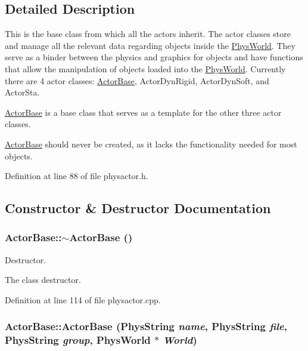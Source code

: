 \subsection{Detailed Description}
This is the base class from which all the actors inherit. The actor classes store and manage all the relevant data regarding objects inside the \hyperlink{classPhysWorld}{PhysWorld}. They serve as a binder between the physics and graphics for objects and have functions that allow the manipulation of objects loaded into the \hyperlink{classPhysWorld}{PhysWorld}. Currently there are 4 actor classes: \hyperlink{classActorBase}{ActorBase}, ActorDynRigid, ActorDynSoft, and ActorSta. \par
 \hyperlink{classActorBase}{ActorBase} is a base class that serves as a template for the other three actor classes. \par
 \hyperlink{classActorBase}{ActorBase} should never be created, as it lacks the functionality needed for most objects. 

Definition at line 88 of file physactor.h.



\subsection{Constructor \& Destructor Documentation}
\hypertarget{classActorBase_a6fd984c46b3232c2522adb44be4dedb7}{
\subsubsection[{$\sim$ActorBase}]{\setlength{\rightskip}{0pt plus 5cm}ActorBase::$\sim$ActorBase ()}}
\label{dd/d7b/classActorBase_a6fd984c46b3232c2522adb44be4dedb7}


Destructor. 

The class destructor. 

Definition at line 114 of file physactor.cpp.

\hypertarget{classActorBase_a673d963aa7a99475cb03250c010dfa15}{
\subsubsection[{ActorBase}]{\setlength{\rightskip}{0pt plus 5cm}ActorBase::ActorBase (PhysString {\em name}, \/  PhysString {\em file}, \/  PhysString {\em group}, \/  {\bf PhysWorld} $\ast$ {\em World})}}
\label{dd/d7b/classActorBase_a673d963aa7a99475cb03250c010dfa15}


